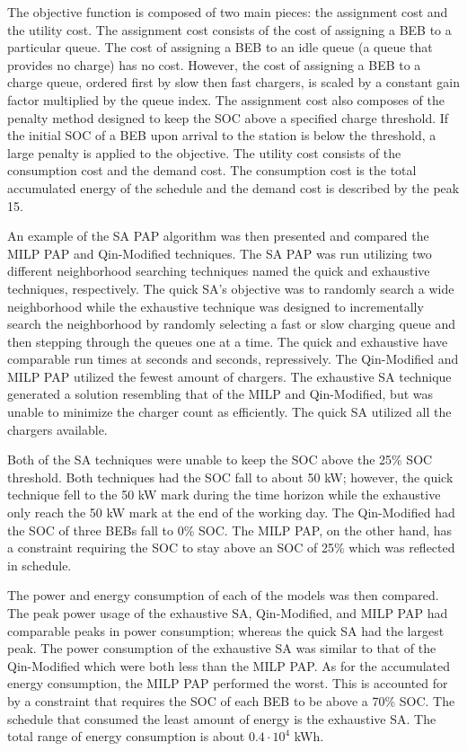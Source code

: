 \documentclass[11pt,a4paper,final]{article}
\newcommand{\tempcnt}{1517 }                                                    %
\newcommand{\quicklocal}{0.45 }                                                 %
\newcommand{\exhaustivelocal}{0.5 }                                             %
\begin{document}
The objective function is composed of two main pieces: the assignment cost and the utility cost. The assignment cost
consists of the cost of assigning a BEB to a particular queue. The cost of assigning a BEB to an idle queue (a queue
that provides no charge) has no cost. However, the cost of assigning a BEB to a charge queue, ordered first by slow then
fast chargers, is scaled by a constant gain factor multiplied by the queue index. The assignment cost also composes of
the penalty method designed to keep the SOC above a specified charge threshold. If the initial SOC of a BEB upon arrival
to the station is below the threshold, a large penalty is applied to the objective. The utility cost consists of the
consumption cost and the demand cost. The consumption cost is the total accumulated energy of the schedule and the
demand cost is described by the peak 15.

An example of the SA PAP algorithm was then presented and compared the MILP PAP and Qin-Modified techniques. The SA PAP
was run utilizing two different neighborhood searching techniques named the quick and exhaustive techniques,
respectively. The quick SA's objective was to randomly search a wide neighborhood while the exhaustive technique was
designed to incrementally search the neighborhood by randomly selecting a fast or slow charging queue and then stepping
through the queues one at a time. The quick and exhaustive have comparable run times at \fpeval{\quicklocal * \tempcnt} seconds and \fpeval{\exhaustivelocal * \tempcnt} seconds, repressively. The Qin-Modified and MILP
PAP utilized the fewest amount of chargers. The exhaustive SA technique generated a solution resembling that of the MILP and Qin-Modified, but was unable to minimize the charger count as efficiently. The quick SA utilized all the chargers available.

Both of the SA techniques were unable to keep the SOC above the 25\% SOC threshold. Both techniques had the SOC fall to
about 50 kW; however, the quick technique fell to the 50 kW mark during the time horizon while the exhaustive only reach
the 50 kW mark at the end of the working day. The Qin-Modified had the SOC of three BEBs fall to 0\% SOC. The MILP PAP,
on the other hand, has a constraint requiring the SOC to stay above an SOC of 25\% which was reflected in schedule.

The power and energy consumption of each of the models was then compared. The peak power usage of the exhaustive SA,
Qin-Modified, and MILP PAP had comparable peaks in power consumption; whereas the quick SA had the largest peak. The
power consumption of the exhaustive SA was similar to that of the Qin-Modified which were both less than the MILP PAP.
As for the accumulated energy consumption, the MILP PAP performed the worst. This is accounted for by a constraint that
requires the SOC of each BEB to be above a 70\% SOC. The schedule that consumed the least amount of energy is the
exhaustive SA. The total range of energy consumption is about \(0.4 \cdot 10^4\) kWh.
\end{document}
